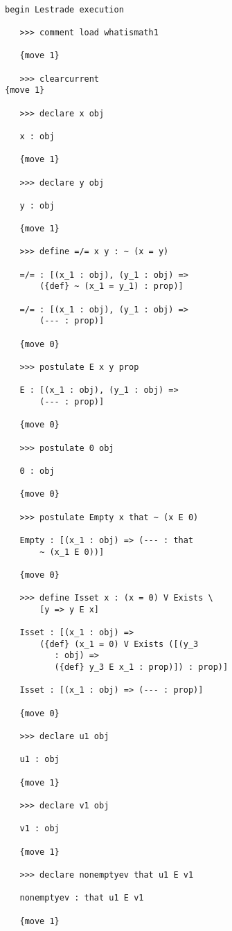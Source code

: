 \documentclass[12pt]{article}
\begin{document}
\begin{verbatim}

begin Lestrade execution

   >>> comment load whatismath1

   {move 1}

   >>> clearcurrent
{move 1}

   >>> declare x obj

   x : obj

   {move 1}

   >>> declare y obj

   y : obj

   {move 1}

   >>> define =/= x y : ~ (x = y)

   =/= : [(x_1 : obj), (y_1 : obj) => 
       ({def} ~ (x_1 = y_1) : prop)]

   =/= : [(x_1 : obj), (y_1 : obj) => 
       (--- : prop)]

   {move 0}

   >>> postulate E x y prop

   E : [(x_1 : obj), (y_1 : obj) => 
       (--- : prop)]

   {move 0}

   >>> postulate 0 obj

   0 : obj

   {move 0}

   >>> postulate Empty x that ~ (x E 0)

   Empty : [(x_1 : obj) => (--- : that 
       ~ (x_1 E 0))]

   {move 0}

   >>> define Isset x : (x = 0) V Exists \
       [y => y E x]

   Isset : [(x_1 : obj) => 
       ({def} (x_1 = 0) V Exists ([(y_3 
          : obj) => 
          ({def} y_3 E x_1 : prop)]) : prop)]

   Isset : [(x_1 : obj) => (--- : prop)]

   {move 0}

   >>> declare u1 obj

   u1 : obj

   {move 1}

   >>> declare v1 obj

   v1 : obj

   {move 1}

   >>> declare nonemptyev that u1 E v1

   nonemptyev : that u1 E v1

   {move 1}


\end{verbatim}
\end{document}
